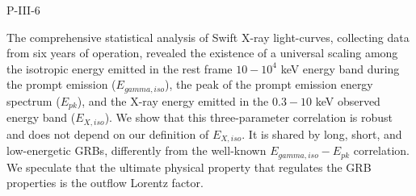 P-III-6


\bigskip



\bigskip

\noindent The comprehensive statistical analysis of Swift X-ray light-curves, collecting data from six years of operation, revealed the existence of a universal scaling among the isotropic energy emitted in the rest frame $10-10^4$ keV energy band during the prompt emission ($E_{gamma,iso}$), the peak of the prompt emission energy spectrum ($E_{pk}$), and the X-ray energy emitted in the $0.3-10$ keV observed energy band ($E_{X,iso}$). We show that this three-parameter correlation is robust and does not depend on our definition of $E_{X,iso}$. It is shared by long, short, and low-energetic GRBs, differently from the well-known $E_{gamma,iso}-E_{pk}$ correlation. We speculate that the ultimate physical property that regulates the GRB properties is the outflow Lorentz factor.
